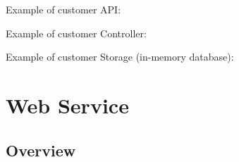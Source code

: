 \documentclass[presentation]{beamer}\mode<presentation>{\usetheme{AMSCesenaPurpleAndGold}}
\begin{document}
\begin{frame}[allowframebreaks]
    \framebreak

    Example of customer API:
    

    \framebreak

    Example of customer Controller:
    

    \framebreak

    Example of customer Storage (in-memory database):
    

\end{frame}


\section{\linda{} Web Service}

\subsection{Overview}
\end{document}
